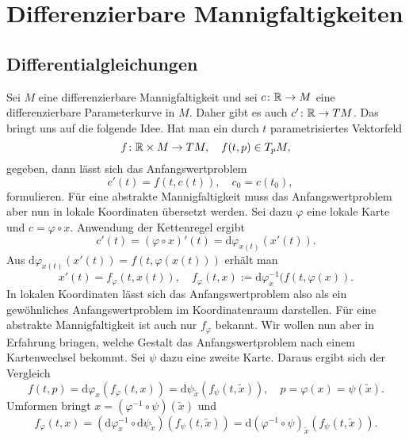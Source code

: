 
\chapter{Differenzierbare Mannigfaltigkeiten}

\section{Differentialgleichungen}

Sei $M$ eine differenzierbare Mannigfaltigkeit und sei $c\colon\mathbb R\to M$
eine differenzierbare Parameterkurve in $M$. Daher gibt es auch
$c'\colon\mathbb R\to TM$. Das bringt uns auf die folgende Idee. Hat man
ein durch $t$ parametrisiertes Vektorfeld
\begin{equation}
f\colon\mathbb R\times M\to TM,\quad f(t,p)\in T_p M,
\end{equation}
gegeben, dann lässt sich das
Anfangswertproblem
\begin{equation}
c'(t) = f(t,c(t)),\quad c_0=c(t_0),\quad 
\end{equation}
formulieren. Für eine abstrakte Mannigfaltigkeit muss das
Anfangswertproblem aber nun in lokale Koordinaten übersetzt
werden. Sei dazu $\varphi$ eine lokale Karte und $c=\varphi\circ x$.
Anwendung der Kettenregel ergibt
\begin{equation}
c'(t) = (\varphi\circ x)'(t) = \mathrm d\varphi_{x(t)}(x'(t)).
\end{equation}
Aus $\mathrm d\varphi_{x(t)}(x'(t))=f(t,\varphi(x(t)))$ erhält man
\begin{equation}
x'(t) = f_\varphi(t,x(t)),\quad
f_\varphi(t,x):=\mathrm d\varphi_{x}^{-1}(f(t,\varphi(x)).
\end{equation}
In lokalen Koordinaten lässt sich das Anfangswertproblem also als
ein gewöhnliches Anfangswertproblem im Koordinatenraum darstellen.
Für eine abstrakte Mannigfaltigkeit ist auch nur $f_\varphi$ bekannt.
Wir wollen nun aber in Erfahrung bringen, welche Gestalt das
Anfangswertproblem nach einem Kartenwechsel bekommt. Sei $\psi$
dazu eine zweite Karte. Daraus ergibt sich der Vergleich
\begin{equation}
f(t,p)
= \mathrm d\varphi_x(f_\varphi(t,x))
= \mathrm d\psi_{\tilde x}(f_\psi(t,\tilde x)),\quad
p = \varphi(x) = \psi(\tilde x).
\end{equation}
Umformen bringt $x = (\varphi^{-1}\circ\psi)(\tilde x)$ und
\begin{equation}
f_\varphi(t,x) = (\mathrm d\varphi_x^{-1}\circ \mathrm d\psi_{\tilde x})(f_\psi(t,\tilde x))
= \mathrm d(\varphi^{-1}\circ \psi)_{\tilde x}(f_\psi(t,\tilde x)).
\end{equation}
